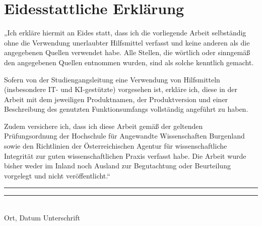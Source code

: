 {}
\chapter*{Eidesstattliche Erklärung}

„Ich erkläre hiermit an Eides statt, dass ich die vorliegende Arbeit selbständig ohne die Verwendung unerlaubter Hilfsmittel verfasst und keine anderen als die angegebenen Quellen verwendet habe. Alle Stellen, die wörtlich oder sinngemäß den angegebenen Quellen entnommen wurden, sind als solche kenntlich gemacht. 

\noindent

Sofern von der Studiengangsleitung eine Verwendung von Hilfsmitteln (insbesondere IT- und KI-gestützte) vorgesehen ist, erkläre ich, diese in der Arbeit mit dem jeweiligen Produktnamen, der Produktversion und einer Beschreibung des genutzten Funktionsumfangs vollständig angeführt zu haben. 

\noindent

Zudem versichere ich, dass ich diese Arbeit gemäß der geltenden Prüfungsordnung der Hochschule für Angewandte Wissenschaften Burgenland sowie den Richtlinien der Österreichischen Agentur für wissenschaftliche Integrität zur guten wissenschaftlichen Praxis verfasst habe. Die Arbeit wurde bisher weder im Inland noch Ausland zur Begutachtung oder Beurteilung vorgelegt und nicht veröffentlicht.“

\vspace{3cm}

\noindent

\rule[1em]{15em}{0.5pt}  \hfill \rule[1em]{15em}{0.5pt}\\ %
Ort, Datum \hfill Unterschrift\\

